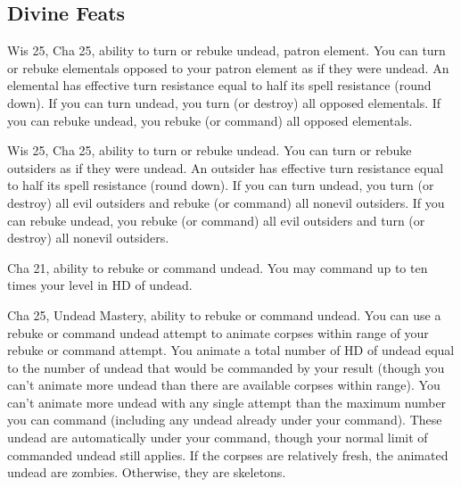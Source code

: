 \subsection{Divine Feats}
{Wis 25, Cha 25, ability to turn or rebuke undead, patron element.}
{
  You can turn or rebuke elementals opposed to your patron element as if they were undead. An elemental has effective turn resistance equal to half its spell resistance (round down). If you can turn undead, you turn (or destroy) all opposed elementals. If you can rebuke undead, you rebuke (or command) all opposed elementals.
}

{Wis 25, Cha 25, ability to turn or rebuke undead.}
{
  You can turn or rebuke outsiders as if they were undead. An outsider has effective turn resistance equal to half its spell resistance (round down). If you can turn undead, you turn (or destroy) all evil outsiders and rebuke (or command) all nonevil outsiders. If you can rebuke undead, you rebuke (or command) all evil outsiders and turn (or destroy) all nonevil outsiders.
}

{Cha 21, ability to rebuke or command undead.}
{You may command up to ten times your level in HD of undead.}

{Cha 25, Undead Mastery, ability to rebuke or command undead.}
{You can use a rebuke or command undead attempt to animate corpses within range of your rebuke or command attempt. You animate a total number of HD of undead equal to the number of undead that would be commanded by your result (though you can’t animate more undead than there are available corpses within range). You can’t animate more undead with any single attempt than the maximum number you can command (including any undead already under your command). These undead are automatically under your command, though your normal limit of commanded undead still applies. If the corpses are relatively fresh, the animated undead are zombies. Otherwise, they are skeletons.}
